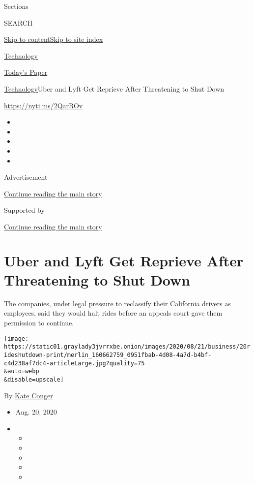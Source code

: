 Sections

SEARCH

\protect\hyperlink{site-content}{Skip to
content}\protect\hyperlink{site-index}{Skip to site index}

\href{https://www.nytimes3xbfgragh.onion/section/technology}{Technology}

\href{https://myaccount.nytimes3xbfgragh.onion/auth/login?response_type=cookie\&client_id=vi}{}

\href{https://www.nytimes3xbfgragh.onion/section/todayspaper}{Today's
Paper}

\href{/section/technology}{Technology}\textbar{}Uber and Lyft Get
Reprieve After Threatening to Shut Down

\url{https://nyti.ms/2QarROv}

\begin{itemize}
\item
\item
\item
\item
\item
\end{itemize}

Advertisement

\protect\hyperlink{after-top}{Continue reading the main story}

Supported by

\protect\hyperlink{after-sponsor}{Continue reading the main story}

\hypertarget{uber-and-lyft-get-reprieve-after-threatening-to-shut-down}{%
\section{Uber and Lyft Get Reprieve After Threatening to Shut
Down}\label{uber-and-lyft-get-reprieve-after-threatening-to-shut-down}}

The companies, under legal pressure to reclassify their California
drivers as employees, said they would halt rides before an appeals court
gave them permission to continue.

\texttt{[image: https://static01.graylady3jvrrxbe.onion/images/2020/08/21/business/20rideshutdown-print/merlin\_160662759\_0951fbab-4d08-4a7d-b4bf-c4d238af7dc4-articleLarge.jpg?quality=75\\\&auto=webp\\\&disable=upscale]}

By \href{https://www.nytimes3xbfgragh.onion/by/kate-conger}{Kate Conger}

\begin{itemize}
\item
  Aug. 20, 2020
\item
  \begin{itemize}
  \item
  \item
  \item
  \item
  \item
  \end{itemize}
\end{itemize}

